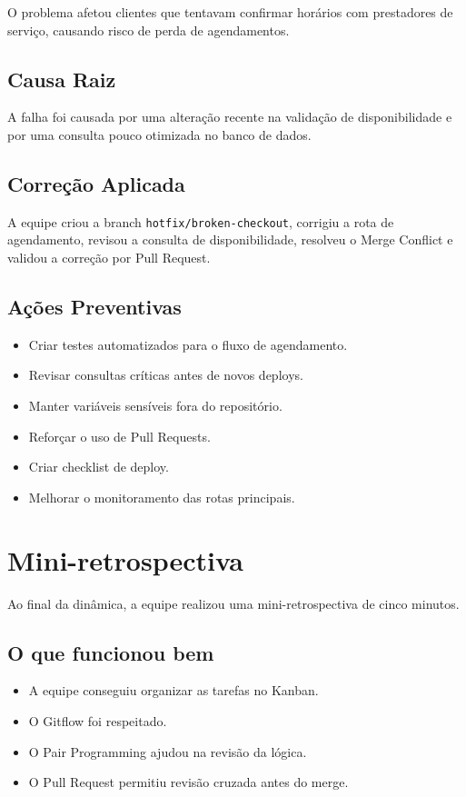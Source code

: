 \documentclass[12pt,a4paper]{article}
\begin{document}
O problema afetou clientes que tentavam confirmar horários com prestadores de serviço, causando risco de perda de agendamentos.

\subsection*{Causa Raiz}

A falha foi causada por uma alteração recente na validação de disponibilidade e por uma consulta pouco otimizada no banco de dados.

\subsection*{Correção Aplicada}

A equipe criou a branch \texttt{hotfix/broken-checkout}, corrigiu a rota de agendamento, revisou a consulta de disponibilidade, resolveu o Merge Conflict e validou a correção por Pull Request.

\subsection*{Ações Preventivas}

\begin{itemize}
    \item Criar testes automatizados para o fluxo de agendamento.
    \item Revisar consultas críticas antes de novos deploys.
    \item Manter variáveis sensíveis fora do repositório.
    \item Reforçar o uso de Pull Requests.
    \item Criar checklist de deploy.
    \item Melhorar o monitoramento das rotas principais.
\end{itemize}

\section{Mini-retrospectiva}

Ao final da dinâmica, a equipe realizou uma mini-retrospectiva de cinco minutos.

\subsection*{O que funcionou bem}

\begin{itemize}
    \item A equipe conseguiu organizar as tarefas no Kanban.
    \item O Gitflow foi respeitado.
    \item O Pair Programming ajudou na revisão da lógica.
    \item O Pull Request permitiu revisão cruzada antes do merge.
\end{itemize}
\end{document}
